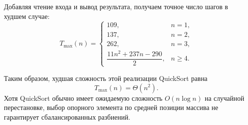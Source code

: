 \documentclass[12pt]{article}
\begin{document}
Добавляя чтение входа и вывод результата, получаем точное число шагов в худшем случае:
\[
\boxed{
T_{\max}(n)=
\begin{cases}
109, & n=1,\\
137, & n=2,\\
262, & n=3,\\
\dfrac{11n^2+237n-290}{2}, & n\geq 4.
\end{cases}
}
\]

Таким образом, худшая сложность этой реализации QuickSort равна
\[
    T_{\max}(n)=\Theta(n^2).
\]
Хотя QuickSort обычно имеет ожидаемую сложность $O(n\log n)$ на случайной перестановке, выбор опорного элемента по средней позиции массива не гарантирует сбалансированных разбиений.
\end{document}
